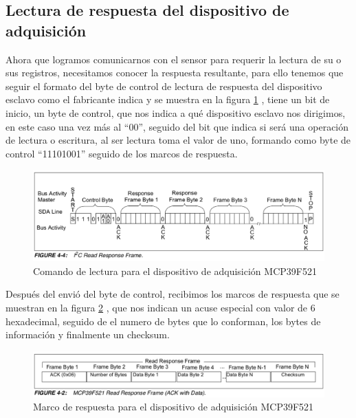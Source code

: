 \paragraph{}
\par

\subsection{Lectura de respuesta del dispositivo de adquisición}

Ahora que logramos comunicarnos con el sensor para requerir la lectura de su o sus registros, necesitamos conocer la respuesta resultante, para ello tenemos que seguir el formato del byte de control de lectura de respuesta del dispositivo esclavo como el fabricante indica y se muestra en la figura \ref{fig:Comando de lectura de respuesta} , tiene un bit de inicio, un byte de control, que nos indica a qué dispositivo esclavo nos dirigimos, en este caso una vez más al “00”, seguido del bit que indica si será una operación de lectura o escritura, al ser lectura toma el valor de uno, formando como byte de control “11101001” seguido de los marcos de respuesta.

\begin{figure}[H]
	\centering
	\includegraphics[scale=.7]{Capitulo5/images/read_command.png}
	\caption{Comando de lectura para el dispositivo de adquisición MCP39F521}
	\label{fig:Comando de lectura de respuesta}
\end{figure}

Después del envió del byte de control, recibimos los marcos de respuesta que se muestran en la figura \ref{fig:Marco de respuesta} , que nos indican un acuse especial con valor de 6 hexadecimal, seguido de el numero de bytes que lo conforman, los bytes de información y finalmente un checksum.

\begin{figure}[H]
	\centering
	\includegraphics[scale=.7]{Capitulo5/images/responde_frame.png}
	\caption{Marco de respuesta para el dispositivo de adquisición MCP39F521}
	\label{fig:Marco de respuesta}
\end{figure}

